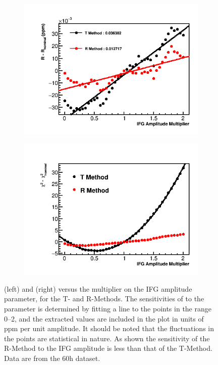 \begin{figure}[h]
\centering
    \begin{subfigure}[t]{0.45\textwidth}
        \centering
        \includegraphics[width=\textwidth]{IFG_Amplitude_Compare_R}
    \end{subfigure}%
    \hspace{1cm}
    \begin{subfigure}[t]{0.45\textwidth}
        \centering
        \includegraphics[width=\textwidth]{IFG_Amplitude_Compare_Chisq}
    \end{subfigure}
\caption[]{\R (left) and \chisq (right) versus the multiplier on the IFG amplitude parameter, for the T- and R-Methods. The sensitivities of \R to the parameter is determined by fitting a line to the points in the range 0--2, and the extracted values are included in the plot in units of ppm per unit amplitude. It should be noted that the fluctuations in the points are statistical in nature. As shown the sensitivity of the R-Method to the IFG amplitude is less than that of the T-Method. Data are from the 60h dataset.}
\label{fig:IFGAmpscan}
\end{figure}



